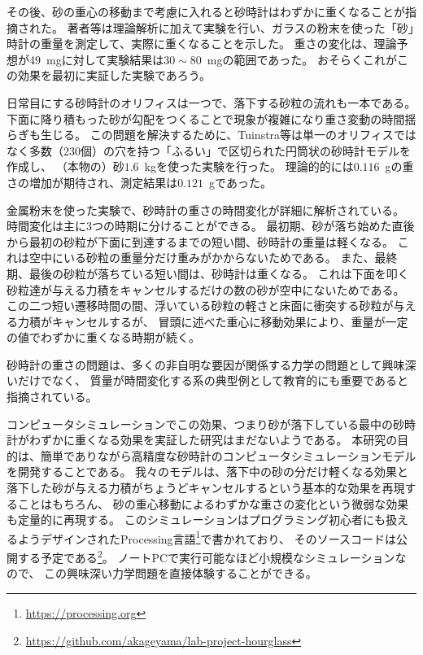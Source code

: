 \documentclass[]{article}
\begin{document}
その後、砂の重心の移動まで考慮に入れると砂時計はわずかに重くなることが指摘された\cite{ShenUnknown-pk}。
著者等は理論解析に加えて実験を行い、ガラスの粉末を使った「砂」時計の重量を測定して、実際に重くなることを示した。
重さの変化は、理論予想が49~\unit{mg}に対して実験結果は$30\sim 80$~\unit{mg}の範囲であった。
おそらくこれがこの効果を最初に実証した実験であろう。


日常目にする砂時計のオリフィスは一つで、落下する砂粒の流れも一本である。
下面に降り積もった砂が勾配をつくることで現象が複雑になり重さ変動の時間揺らぎも生じる。
この問題を解決するために、Tuinstra等は単一のオリフィスではなく多数（230個）の穴を持つ「ふるい」で区切られた円筒状の砂時計モデルを作成し、
（本物の）砂$1.6$~\si{kg}を使った実験を行った\cite{Tuinstra2010-wk}。
理論的的には$0.116$~\si{g}の重さの増加が期待され、測定結果は$0.121$~\si{g}であった。


金属粉末を使った実験で、砂時計の重さの時間変化が詳細に解析されている\cite{Sack2017-rq}。
時間変化は主に3つの時期に分けることができる。
最初期、砂が落ち始めた直後から最初の砂粒が下面に到達するまでの短い間、砂時計の重量は軽くなる。
これは空中にいる砂粒の重量分だけ重みがかからないためである。
また、最終期、最後の砂粒が落ちている短い間は、砂時計は重くなる。
これは下面を叩く砂粒達が与える力積をキャンセルするだけの数の砂が空中にないためである。
この二つ短い遷移時間の間、浮いている砂粒の軽さと床面に衝突する砂粒が与える力積がキャンセルするが、
冒頭に述べた重心に移動効果により、重量が一定の値でわずかに重くなる時期が続く。


砂時計の重さの問題は、多くの非自明な要因が関係する力学の問題として興味深いだけでなく、
質量が時間変化する系の典型例として教育的にも重要であると指摘されている\cite{Kassandrov2023-tn}。


コンピュータシミュレーションでこの効果、つまり砂が落下している最中の砂時計がわずかに重くなる効果を実証した研究はまだないようである。
本研究の目的は、簡単でありながら高精度な砂時計のコンピュータシミュレーションモデルを開発することである。
我々のモデルは、落下中の砂の分だけ軽くなる効果と落下した砂が与える力積がちょうどキャンセルするという基本的な効果を再現することはもちろん、
砂の重心移動によるわずかな重さの変化という微弱な効果も定量的に再現する。
このシミュレーションはプログラミング初心者にも扱えるようデザインされたProcessing言語\footnote{\url{https://processing.org}}で書かれており、
そのソースコードは公開する予定である\footnote{\url{https://github.com/akageyama/lab-project-hourglass}}。
ノートPCで実行可能なほど小規模なシミュレーションなので、
この興味深い力学問題を直接体験することができる。
\end{document}
